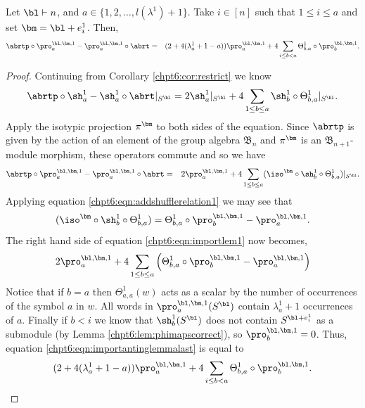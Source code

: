 \documentclass[11pt]{report}
\begin{document}
\begin{lemma}
	\label{chpt6:lem:lifting1}
	Let $\bl \vdash n$, and  $a \in \{1,2,\ldots,l(\lambda^{1})+1\}$. Take $i\in [n]$ such that  $1 \leq i \leq a$ and set $\bm = \bl +e_{i}^{1}$. Then,
	\begin{eqnarray*}
		\abrtp\circ \pro^{\bl,\bm,1}_{a} - 
		\pro^{\bl,\bm,1}_{a} \circ \abrt & = & (2 + 
		4(\lambda^{1}_{a}+1-a)) \pro^{\bl,\bm,1}_{a} +  4 \sum_{i\leq b < a} \Theta_{b,a}^{1} \circ 
		\pro^{\bl,\bm,1}_{b}.
	\end{eqnarray*}
\end{lemma}
\begin{proof}
	Continuing from Corollary \ref{chpt6:cor:restrict} we know
	\[			\abrtp \circ \sh_{a}^{1} - \sh_{a}^{1} \circ 
	\abrt |_{S^{\bl}}  = 2\sh_{a}^{1}|_{S^{\bl}}   +  
	4  \sum_{1 \leq b \leq a } 	\sh_{b}^{1}\circ\Theta_{b,a}^{1} |_{S^{\bl}} .\]
	Apply the isotypic projection $\pi^{\bm}$ to both sides of the equation. Since $\abrtp$ is given by the action of an element of the group algebra $\mathfrak{B}_{n}$ and $\pi^{\bm}$ is an $\mathfrak{B}_{n+1}$-module morphism, these operators commute and so we have			
	\begin{eqnarray}
	\abrtp \circ \pro^{\bl,\bm,1}_{a} - \pro^{\bl,\bm,1}_{a} \circ 
	\abrt & = &2 \pro^{\bl,\bm,1}_{a}   +  
	4  \sum_{1 \leq b \leq a} (\iso^{\bm} \circ	\sh_{b}^{1}\circ\Theta_{b,a}^{1} )|_{S^{\bl}}. \label{chpt6:eqn:importlem1}
	\end{eqnarray}	
	Applying equation \eqref{chpt6:eqn:addshufflerelation1} we may see that
	\[(\iso^{\bm} \circ	\sh_{b}^{1}\circ\Theta_{b,a}^{1} ) =  \Theta_{b,a}^{1} \circ  \pro^{\bl,\bm,1}_{b} -  \pro^{\bl,\bm,1}_{a}.\]
	The right hand side of equation \eqref{chpt6:eqn:importlem1} now becomes,
	\begin{eqnarray}
	2\pro^{\bl,\bm,1}_{a} +  
	4  \sum_{1 \leq b \leq a} \left(\Theta_{b,a}^{1} \circ \pro^{\bl,\bm,1}_{b} -  \pro^{\bl,\bm,1}_{a} \right) \label{chpt6:eqn:importantinglemmalast}
	\end{eqnarray}
	Notice that if $b=a$ then $\Theta_{a,a}^{1} (w)$ acts as a scalar by the number of occurrences of the symbol $a$ in $w$. All words in $\pro^{\bl,\bm,1}_{a}(S^{\bl})$ contain $\lambda_{a}^{1} +1$ occurrences of $a$.
	Finally if $b<i$ we know that $\sh_{b}^{1}(S^{\bl})$ does not contain $S^{\bl+e_{i}^{1}}$ as a submodule (by Lemma \ref{chpt6:lem:phimapscorrect}), so $\pro^{\bl,\bm,1}_{b} =0$. Thus, equation \eqref{chpt6:eqn:importantinglemmalast} is equal to
	\[( 2 +4(\lambda_{a}^{1} + 1 -a)) \pro^{\bl,\bm,1}_{a} +  
	4  \sum_{i \leq b < a} \Theta_{b,a}^{1} \circ \pro^{\bl,\bm,1}_{b}.\]
\end{proof}
\end{document}
